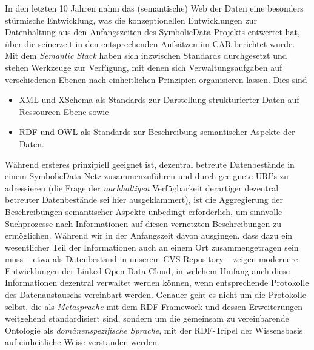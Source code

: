 \documentclass{article}
\newcommand{\SD}{{\sc Symbolic\-Data}}
\begin{document}
In den letzten 10 Jahren nahm das (semantische) Web der Daten eine besonders
stürmische Entwicklung, was die konzeptionellen Entwicklungen zur Datenhaltung
aus den Anfangszeiten des \SD-Projekts entwertet hat, über die seinerzeit in
den entsprechenden Aufsätzen im CAR berichtet wurde.  Mit dem \emph{Semantic
  Stack} haben sich inzwischen Standards durchgesetzt und stehen Werkzeuge zur
Verfügung, mit denen sich Verwaltungsaufgaben auf verschiedenen Ebenen nach
einheitlichen Prinzipien organisieren lassen. Dies sind 
\begin{itemize}\raggedright
\item XML und XSchema als Standards zur Darstellung strukturierter Daten auf
  Ressourcen-Ebene sowie 
\item RDF und OWL als Standards zur Beschreibung semantischer Aspekte der
  Daten.
\end{itemize}
Während ersteres prinzipiell geeignet ist, dezentral betreute Datenbestände in
einem \SD-Netz zusammenzuführen und durch geeignete URI's zu adressieren (die
Frage der \emph{nachhaltigen} Verfügbarkeit derartiger dezentral betreuter
Datenbestände sei hier ausgeklammert), ist die Aggregierung der Beschreibungen
semantischer Aspekte unbedingt erforderlich, um sinnvolle Suchprozesse nach
Informationen auf diesen vernetzten Beschreibungen zu ermöglichen.  Während
wir in der Anfangszeit davon ausgingen, dass dazu ein wesentlicher Teil der
Informationen auch an einem Ort zusammengetragen sein muss -- etwa als
Datenbestand in unserem CVS-Repository -- zeigen modernere Entwicklungen der
Linked Open Data Cloud, in welchem Umfang auch diese Informationen dezentral
verwaltet werden können, wenn entsprechende Protokolle des Datenaustauschs
vereinbart werden. Genauer geht es nicht um die Protokolle selbst, die als
\emph{Metasprache} mit dem RDF-Framework und dessen Erweiterungen weitgehend
standardisiert sind, sondern um die gemeinsam zu vereinbarende Ontologie als
\emph{domänenspezifische Sprache}, mit der RDF-Tripel der Wissensbasis auf
einheitliche Weise {\glqq}verstanden{\grqq} werden.
\end{document}
